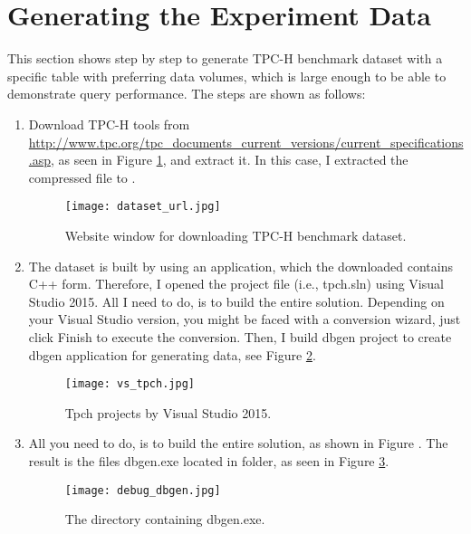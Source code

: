 \documentclass[../main/thesis.tex]{subfiles}
\begin{document}
\section{Generating the Experiment Data}
This section shows step by step to generate TPC-H benchmark dataset with a specific table with preferring data volumes, which is large enough to be able to demonstrate query performance. The steps are shown as follows:

\begin{enumerate}[label=\thesection.\arabic*, leftmargin=1.7cm]
	\item Download TPC-H tools from \url{http://www.tpc.org/tpc_documents_current_versions/current_specifications.asp}, as seen in Figure \ref{fig:dataset_url}, and extract it. In this case, I extracted the compressed file to .
	
	\begin{figure}[h]
		\centering
		\texttt{[image: dataset\_url.jpg]}
		\caption{Website window for downloading TPC-H benchmark dataset.}
		\label{fig:dataset_url}
	\end{figure}	
	
	\item The dataset is built by using an application, which the downloaded contains C++ form. Therefore, I opened the project file (i.e., tpch.sln) using Visual Studio 2015. All I need to do, is to build the entire solution. Depending on your Visual Studio version, you might be faced with a conversion wizard, just click Finish to execute the conversion. Then, I build dbgen project to create dbgen application for generating data, see Figure \ref{fig:vs_tpch}.
	
	\begin{figure}[h]
		\centering
		\texttt{[image: vs\_tpch.jpg]}
		\caption{Tpch projects by Visual Studio 2015.}
		\label{fig:vs_tpch}
	\end{figure}
	
	\item All you need to do, is to build the entire solution, as shown in Figure . The result is the files dbgen.exe located in  folder, as seen in Figure \ref{fig:debug_dbgen}.
	
	\begin{figure}[h]
		\centering
		\texttt{[image: debug\_dbgen.jpg]}
		\caption{The directory containing dbgen.exe.}
		\label{fig:debug_dbgen}
	\end{figure}


\end{enumerate}
\end{document}
